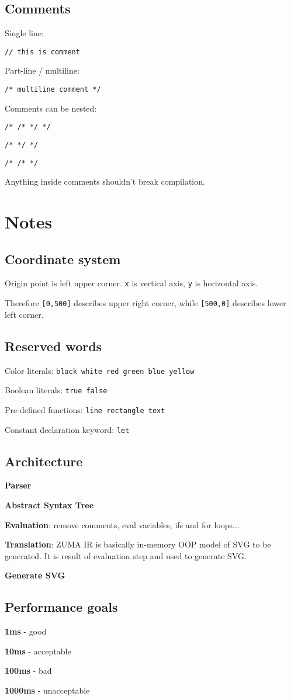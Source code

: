 \documentclass{scrreprt}
\begin{document}
\section{Comments}

Single line:

\texttt{// this is comment}

Part-line / multiline:

\texttt{/* multiline comment */}

Comments can be nested:

\texttt{/* /* */ */}

\texttt{/* */ */}

\texttt{/* /* */}

Anything inside comments shouldn't break compilation.


\chapter{Notes}

\section{Coordinate system}

Origin point is left upper corner. \texttt{x} is vertical axis, \texttt{y} is horizontal axis.

Therefore \texttt{[0,500]} describes upper right corner, while \texttt{[500,0]} describes lower left corner.


\section{Reserved words}

Color literals: \texttt{black white red green blue yellow}

Boolean literals: \texttt{true false}

Pre-defined functions: \texttt{line rectangle text}

Constant declaration keyword: \texttt{let}


\section{Architecture}

\textbf{Parser}

\textbf{Abstract Syntax Tree}

\textbf{Evaluation}: remove comments, eval variables, ifs and for loops...

\textbf{Translation}: ZUMA IR is basically in-memory OOP model of SVG to be generated. It is result of evaluation step and used to generate SVG.

\textbf{Generate SVG} 


\section{Performance goals}

\textbf{1ms} - good

\textbf{10ms} - acceptable

\textbf{100ms} - bad

\textbf{1000ms} - unacceptable
\end{document}
